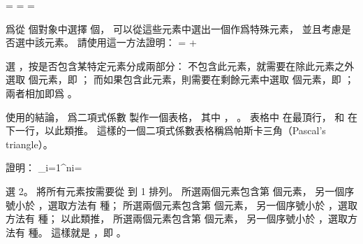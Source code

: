 \startANSWER
\startformula
{} = 
    = 
    = 
\stopformula
\stopANSWER

\startEXERCISE[exercise:C.1-7]
爲從  個對象中選擇  個，
可以從這些元素中選出一個作爲特殊元素，
並且考慮是否選中該元素。
請使用這一方法證明：
\startformula
{} =  + 
\stopformula
\stopEXERCISE

\startANSWER
{} 選 ，按是否包含某特定元素分成兩部分：
不包含此元素，就需要在除此元素之外選取  個元素，即 ；
而如果包含此元素，則需要在剩餘元素中選取  個元素，即 ；
兩者相加即爲 。
\stopANSWER

\startEXERCISE
使用\inexercise[C.1-7] 的結論，
爲二項式係數  製作一個表格，
其中 ， 。
表格中  在最頂行，
  和  在下一行，以此類推。
這樣的一個二項式係數表格稱爲{\EMP 帕斯卡三角}（Pascal's triangle）。
\stopEXERCISE

\startANSWER
\startformula\startmathalignment[n=13,align={
 middle,middle,middle,middle,middle,middle,middle,middle,middle,middle,middle,middle,middle}]
\NC   \NC   \NC   \NC   \NC    \NC    {}  \NC    \NC    \NC   \NC   \NC   \NC   \NR
\NC   \NC   \NC   \NC   \NC    {}  \NC    {}  \NC    \NC   \NC   \NC   \NC   \NR
\NC   \NC   \NC   \NC   {}  \NC    {}  \NC    {}  \NC   \NC   \NC   \NC   \NR
\NC   \NC   \NC   {} \NC    {}  \NC    {}  \NC    {} \NC   \NC   \NC   \NR
\NC   \NC   {} \NC   {}  \NC    {}  \NC    {}  \NC   {} \NC   \NC   \NR
\NC   {} \NC   {} \NC    {} \NC    {} \NC    {} \NC   {} \NC   \NR
{} \NC   {} \NC   {} \NC    {} \NC    {} \NC   {} \NC   {} \NR
\stopmathalignment\stopformula
\stopANSWER

\startEXERCISE
證明：
\startformula
\sum_{i=1}^{n}i=
\stopformula
\stopEXERCISE

\startANSWER
{} 選 2。
將所有元素按需要從  到 1 排列。
所選兩個元素包含第  個元素，
另一個序號小於 ，選取方法有  種；
所選兩個元素包含第  個元素，
另一個序號小於 ，選取方法有  種；
以此類推，
所選兩個元素包含第  個元素，
另一個序號小於 ，選取方法有  種。
這樣就是 ，即 。
\stopANSWER

